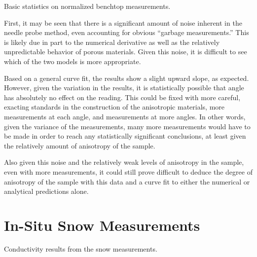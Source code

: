 \begin{table}[h]
\centering

\label{tab:pow-stats}
\caption{Basic statistics on normalized benchtop measurements.}
\end{table}


First, it may be seen that there is a significant amount of noise inherent in
the needle probe method, even accounting for obvious ``garbage measurements.''
This is likely due in part to the numerical derivative as well as the relatively
unpredictable behavior of porous materials. Given
this noise, it is difficult to see which of the two models is more appropriate.

Based on a general curve fit, the results show a slight upward slope, as
expected. However, given the variation in the results, it is statistically
possible that angle has absolutely no effect on the reading. This could be fixed
with more careful, exacting standards in the construction of the anisotropic
materials, more measurements at each angle, and measurements at more angles.
In other words, given the variance of the measurements, many more measurements
would have to be made in order to reach any statistically significant
conclusions, at least given the relatively amount of anisotropy of the sample.

Also given this noise and the relatively weak levels of anisotropy in the
sample, even with more measurements, it could still prove difficult to deduce
the degree of anisotropy of the sample with this data and a curve fit to either
the numerical or analytical predictions alone.

\section{In-Situ Snow Measurements}

\begin{table}[h]
\centering

\label{tab:snow}
\caption{Conductivity results from the snow measurements.}
\end{table}

